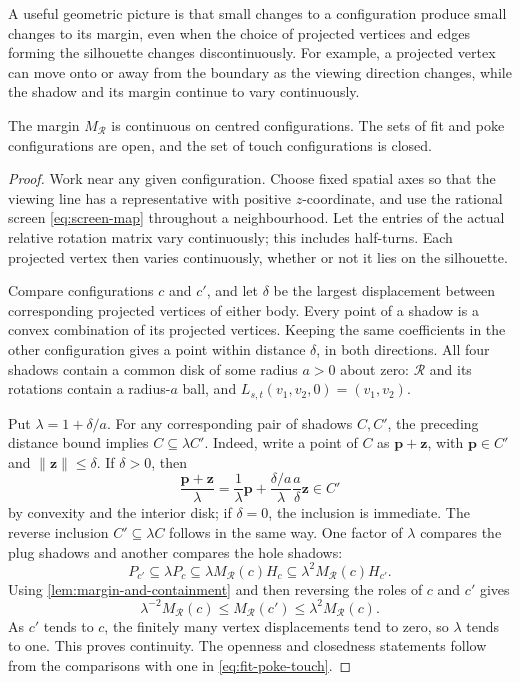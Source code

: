 A useful geometric picture is that small changes to a configuration produce
small changes to its margin, even when the choice of projected vertices and
edges forming the silhouette changes discontinuously. For example, a projected
vertex can move onto or away from the boundary as the viewing direction
changes, while the shadow and its margin continue to vary continuously.

\begin{proposition}\label{prop:continuity-and-openness}
  The margin $M_{\mathcal R}$ is continuous on centred configurations. The sets of
  fit and poke configurations are open, and the set of touch configurations
  is closed.
\end{proposition}
\begin{proof}
  Work near any given configuration. Choose fixed spatial axes so that
  the viewing line has a representative with positive $z$-coordinate, and use the rational
  screen \cref{eq:screen-map} throughout a neighbourhood. Let the entries
  of the actual relative rotation matrix vary continuously; this includes
  half-turns. Each projected vertex then varies continuously, whether or
  not it lies on the silhouette.

  Compare configurations $c$ and $c'$, and let $\delta$ be the largest
  displacement between corresponding projected vertices of either body.
  Every point of a shadow is a convex combination of its projected
  vertices. Keeping the same coefficients in the other configuration gives
  a point within distance $\delta$, in both directions.
  All four shadows contain a common disk of some radius $a>0$ about zero:
  $\mathcal R$ and its rotations contain a radius-$a$ ball, and
  $L_{s,t}(v_1,v_2,0)=(v_1,v_2)$.

  Put $\lambda=1+\delta/a$. For any corresponding pair of shadows $C,C'$,
  the preceding distance bound implies $C\subseteq\lambda C'$.
  Indeed, write a point of $C$ as $\mathbf p+\mathbf z$, with $\mathbf p\in C'$ and
  $\lVert\mathbf z\rVert\le\delta$. If $\delta>0$, then
  \[
    \frac{\mathbf p+\mathbf z}{\lambda}
      =\frac{1}{\lambda}\mathbf p+
        \frac{\delta/a}{\lambda}\frac{a}{\delta}\mathbf z
      \in C'
  \]
  by convexity and the interior disk; if $\delta=0$, the inclusion is
  immediate. The reverse inclusion $C'\subseteq\lambda C$ follows in the
  same way. One factor of $\lambda$ compares the plug shadows and another
  compares the hole shadows:
  \[
    P_{c'}\subseteq\lambda P_c
      \subseteq\lambda M_{\mathcal R}(c)H_c
      \subseteq\lambda^2M_{\mathcal R}(c)H_{c'}.
  \]
  Using \cref{lem:margin-and-containment} and then reversing the roles of
  $c$ and $c'$ gives
  \[
    \lambda^{-2}M_{\mathcal R}(c)\le M_{\mathcal R}(c')\le\lambda^2M_{\mathcal R}(c).
  \]
  As $c'$ tends to $c$, the finitely many vertex displacements tend to
  zero, so $\lambda$ tends to one. This proves continuity. The openness
  and closedness statements follow from the comparisons with one in
  \cref{eq:fit-poke-touch}.
\end{proof}
